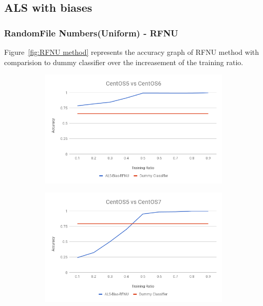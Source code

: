 \documentclass[10pt, conference, compsocconf]{IEEEtran}
\begin{document}
\subsection{ALS with biases}

\subsubsection{RandomFile Numbers(Uniform) - RFNU}
Figure~\ref{fig:RFNU method} represents
the accuracy graph of RFNU method with comparision to dummy
classifier over the increasement of the training ratio.
\begin{figure}[h!]
        \centering
        \begin{subfigure}[b]{0.8\linewidth}
                \includegraphics[width=\columnwidth]{figures/ALS-Bias/RFNU-ALS-Bias-5vs6-PFS}
        \end{subfigure}
        \begin{subfigure}[b]{0.8\linewidth}
                \includegraphics[width=\columnwidth]{figures/ALS-Bias/RFNU-ALS-Bias-5vs7-PFS}

\end{subfigure}
\end{figure}
\end{document}
